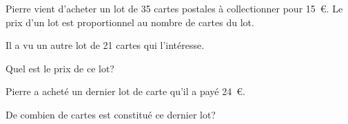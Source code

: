 Pierre vient d'acheter un lot de 35 cartes postales à collectionner pour 15~\textgreek{\euro}. Le prix d'un lot est proportionnel au nombre de cartes du lot.
\begin{myenumerate}
	\item Il a vu un autre lot de 21 cartes qui l'intéresse. 
	 \par Quel est le prix de ce lot?
	\item Pierre a acheté un dernier lot de carte qu'il a payé 24~\textgreek{\euro}.
	  \par De combien de cartes est constitué ce dernier lot?
\end{myenumerate}